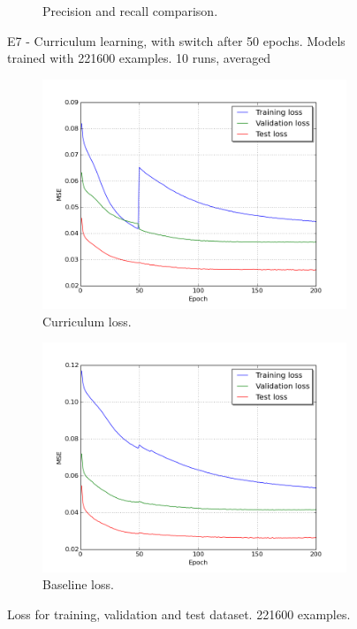 \begin{figure}[!ht]
\begin{subfigure}{0.48\textwidth}
\caption{Precision and recall comparison.} \label{fig:curr100_pr}
\end{subfigure}
\hspace*{\fill} %
\caption{E7 - Curriculum learning, with switch after 50 epochs. Models trained with 221600 examples. 10 runs, averaged} \label{fig:curr100}
\end{figure}


\begin{figure}[!ht]
\begin{subfigure}{0.48\textwidth}
\includegraphics[width=\linewidth]{figs/curr100/curriculum_loss_curves.png}
\caption{Curriculum loss.} \label{fig:curr100_loss2}
\end{subfigure}
\hspace*{\fill} %
\begin{subfigure}{0.48\textwidth}
\includegraphics[width=\linewidth]{figs/curr100/baseline_loss_curves.png}
\caption{Baseline loss.} \label{fig:curr100_epochs_baseline2}
\end{subfigure}
\hspace*{\fill} %
\caption{Loss for training, validation and test dataset. 221600 examples.} \label{fig:curr100_loss_epochs}
\end{figure}

